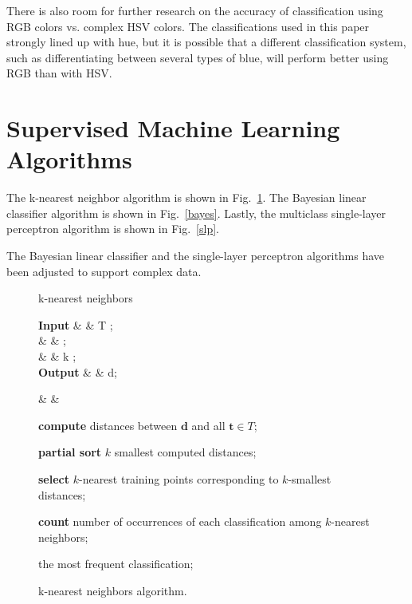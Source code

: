 \documentclass[twoside]{IEEEtran}
\begin{document}
There is also room for further research on the accuracy of classification using RGB colors vs.
complex HSV colors. The classifications used in this paper strongly lined up with hue, but it is
possible that a different classification system, such as differentiating between several types of
blue, will perform better using RGB than with HSV.\@

\appendices%

\section{Supervised Machine Learning Algorithms}%
\label{algorithms}

The k-nearest neighbor algorithm is shown in Fig.~\ref{knn}. The Bayesian linear classifier algorithm is
shown in Fig.~\ref{bayes}. Lastly, the multiclass single-layer perceptron algorithm is shown in Fig.~\ref{slp}.

The Bayesian linear classifier and the single-layer perceptron algorithms have been adjusted to
support complex data.

\begin{figure}[!b]
    \centering
    \setlength{\intextsep}{0pt}

    \begin{algorithm}[H]
        \caption{k-nearest neighbors}

        \begin{flalign*}
            \setlength{\arraycolsep}{0pt}
            \begin{matrix*}[l]
                \textbf{Input}  & \text{: } & T ; \\
                \text{}         &           &  ;  \\
                \text{}         &           & k ;   \\
                \textbf{Output} & \text{: } &  d;
            \end{matrix*} &  &
        \end{flalign*}
        \begin{algorithmic}
            \State%
            \textbf{compute} distances between \( \mathbf{d} \) and all \( \mathbf{t} \in T \);

            \State%
            \textbf{partial sort} \( k \) smallest computed distances;

            \State%
            \textbf{select} \( k \)-nearest training points corresponding to \( k \)-smallest distances;

            \State%
            \textbf{count} number of occurrences of each classification among \( k \)-nearest neighbors;

            \State\Return%
            the most frequent classification;
        \end{algorithmic}
    \end{algorithm}

    \caption{k-nearest neighbors algorithm.}%
    \label{knn}
\end{figure}
\end{document}

